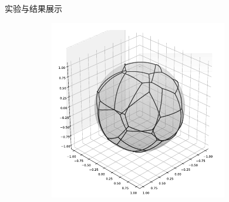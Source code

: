 \documentclass[12pt,aspectratio=169]{beamer}
\begin{document}
\begin{frame}{实验与结果展示}
\begin{figure}[ht]
\begin{subfigure}[b]{0.2\textwidth}
      \label{subfig:2}
    \end{subfigure}
    \hfill
    \begin{subfigure}[b]{0.2\textwidth}
      \centering
      \includegraphics[width=\linewidth]{fig/3.pdf}
      \label{subfig:3}
    \end{subfigure}

    \vspace{-0.7cm}
  

\end{figure}
\end{frame}
\end{document}
